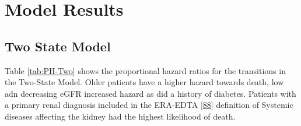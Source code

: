 \documentclass[12pt,PhD,twoside,openright]{muthesis}
\begin{document}
\hypertarget{model-results}{%
\section{Model Results}\label{model-results}}

\hypertarget{two-state-model}{%
\subsection{Two State Model}\label{two-state-model}}

Table \ref{tab:PH-Two} shows the proportional hazard ratios for the transitions in the Two-State Model. Older patients have a higher hazard towards death, low adn decreasing eGFR increased hazard as did a history of diabetes. Patients with a primary renal diagnosis included in the ERA-EDTA {[}\protect\hyperlink{ref-venkat-raman_new_2012}{88}{]} definition of Systemic diseases affecting the kidney had the highest likelihood of death.
\end{document}
